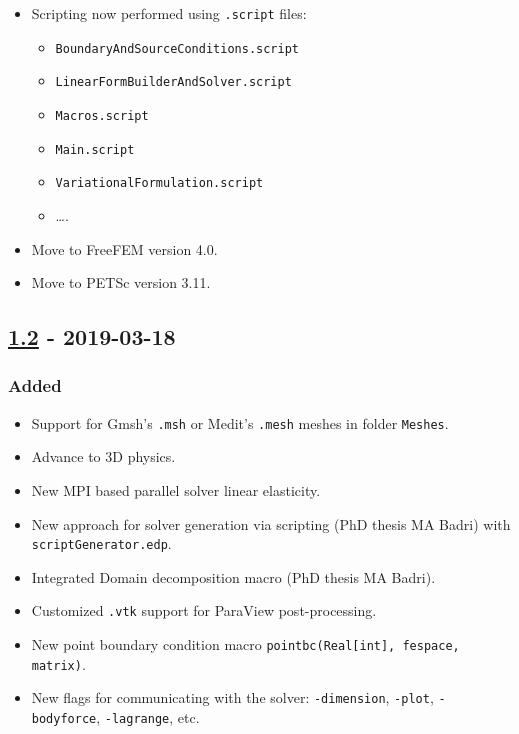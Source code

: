 \begin{itemize}
\tightlist
\item
  Scripting now performed using \lstinline!.script! files:

  \begin{itemize}
  \tightlist
  \item
    \lstinline!BoundaryAndSourceConditions.script!
  \item
    \lstinline!LinearFormBuilderAndSolver.script!
  \item
    \lstinline!Macros.script!
  \item
    \lstinline!Main.script!
  \item
    \lstinline!VariationalFormulation.script!
  \item
    \ldots{}.
  \end{itemize}
\item
  Move to FreeFEM version 4.0.
\item
  Move to PETSc version 3.11.
\end{itemize}

\subsection{\texorpdfstring{\href{https://gitlab.com/PsdSolver/psd_sources/-/tree/v1.1}{1.2}
- 2019-03-18}{1.2 - 2019-03-18}}\label{section-9}

\subsubsection{Added}\label{added-10}

\begin{itemize}
\tightlist
\item
  Support for Gmsh's \lstinline!.msh! or Medit's \lstinline!.mesh!
  meshes in folder \lstinline!Meshes!.
\item
  Advance to 3D physics.
\item
  New MPI based parallel solver linear elasticity.
\item
  New approach for solver generation via scripting (PhD thesis MA Badri)
  with \lstinline!scriptGenerator.edp!.
\item
  Integrated Domain decomposition macro (PhD thesis MA Badri).
\item
  Customized \lstinline!.vtk! support for ParaView post-processing.
\item
  New point boundary condition macro
  \lstinline!pointbc(Real[int], fespace, matrix)!.
\item
  New flags for communicating with the solver: \lstinline!-dimension!,
  \lstinline!-plot!, \lstinline!-bodyforce!, \lstinline!-lagrange!, etc.
\end{itemize}

